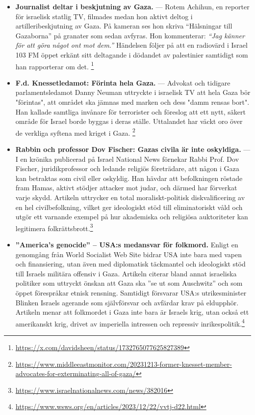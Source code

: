 \documentclass[12pt]{article}
\begin{document}
\begin{itemize}
\item \textbf{Journalist deltar i beskjutning av Gaza.} — Rotem Achihun, en reporter för israelisk statlig TV, filmades medan hon aktivt deltog i artilleribeskjutning av Gaza. På kameran ses hon skriva “Hälsningar till Gazaborna” på granater som sedan avfyras. Hon kommenterar: \textit{“Jag känner för att göra något ont mot dem.”} Händelsen följer på att en radiovärd i Israel 103 FM öppet erkänt sitt deltagande i dödandet av palestinier samtidigt som han rapporterar om det. \footnote{\url{https://x.com/davidsheen/status/1732765077625827389}}

\item \textbf{F.d. Knessetledamot: Förinta hela Gaza.} — Advokat och tidigare parlamentsledamot Danny Neuman uttryckte i israelisk TV att hela Gaza bör "förintas", att området ska jämnas med marken och dess "damm rensas bort". Han kallade samtliga invånare för terrorister och föreslog att ett nytt, säkert område för Israel borde byggas i deras ställe. Uttalandet har väckt oro över de verkliga syftena med kriget i Gaza. \footnote{\url{https://www.middleeastmonitor.com/20231213-former-knesset-member-advocates-for-exterminating-all-of-gaza/}}

\item \textbf{Rabbin och professor Dov Fischer: Gazas civila är inte oskyldiga.} — I en krönika publicerad på Israel National News förnekar Rabbi Prof. Dov Fischer, juridikprofessor och ledande religiös företrädare, att någon i Gaza kan betraktas som civil eller oskyldig. Han hävdar att befolkningen röstade fram Hamas, aktivt stödjer attacker mot judar, och därmed har förverkat varje skydd. Artikeln uttrycker en total moraliskt-politisk diskvalificering av en hel civilbefolkning, vilket ger ideologiskt stöd till eliminatoriskt våld och utgör ett varnande exempel på hur akademiska och religiösa auktoriteter kan legitimera folkrättsbrott.\footnote{\url{https://www.israelnationalnews.com/news/382016}}

\item \textbf{”America’s genocide” – USA:s medansvar för folkmord.} Enligt en genomgång från World Socialist Web Site bidrar USA inte bara med vapen och finansiering, utan även med diplomatisk täckmantel och ideologiskt stöd till Israels militära offensiv i Gaza. Artikeln citerar bland annat israeliska politiker som uttryckt önskan att Gaza ska ”se ut som Auschwitz” och som öppet förespråkar etnisk rensning. Samtidigt försvarar USA:s utrikesminister Blinken Israels agerande som självförsvar och avfärdar krav på eldupphör. Artikeln menar att folkmordet i Gaza inte bara är Israels krig, utan också ett amerikanskt krig, drivet av imperiella intressen och repressiv inrikespolitik.\footnote{\url{https://www.wsws.org/en/articles/2023/12/22/vvtj-d22.html}}


\end{itemize}
\end{document}
